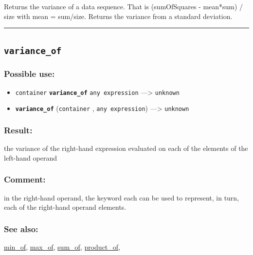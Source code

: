 \documentclass[]{book}
\providecommand{\tightlist}{%
  \setlength{\itemsep}{0pt}\setlength{\parskip}{0pt}}
\theoremstyle{definition}
\theoremstyle{definition}
\theoremstyle{definition}
\theoremstyle{remark}
\begin{document}
Returns the variance of a data sequence. That is (sumOfSquares -
mean*sum) / size with mean = sum/size. Returns the variance from a
standard deviation.

\begin{center}\rule{0.5\linewidth}{\linethickness}\end{center}

\subsection{\texorpdfstring{\texttt{variance\_of}}{variance\_of}}\label{variance_of}

\subsubsection{Possible use:}\label{possible-use-550}

\begin{itemize}
\tightlist
\item
  \texttt{container} \textbf{\texttt{variance\_of}}
  \texttt{any\ expression} ---\textgreater{} \texttt{unknown}
\item
  \textbf{\texttt{variance\_of}} (\texttt{container} ,
  \texttt{any\ expression}) ---\textgreater{} \texttt{unknown}
\end{itemize}

\subsubsection{Result:}\label{result-530}

the variance of the right-hand expression evaluated on each of the
elements of the left-hand operand

\subsubsection{Comment:}\label{comment-106}

in the right-hand operand, the keyword each can be used to represent, in
turn, each of the right-hand operand elements.

\subsubsection{See also:}\label{see-also-218}

\href{operators-i-to-m.html\#min_of}{min\_of},
\href{operators-i-to-m.html\#max_of}{max\_of},
\href{operators-s-to-z.html\#sum_of}{sum\_of},
\href{operators-n-to-r.html\#product_of}{product\_of},
\end{document}
